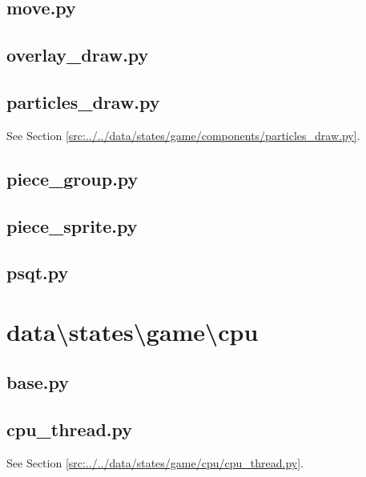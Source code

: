 \documentclass[../main/main.tex]{subfiles}
\begin{document}
\subsection{move.py}

\label{src:data/states/game/components/move.py}

\subsection{overlay\_draw.py}

\label{src:data/states/game/components/overlay_draw.py}

\subsection{particles\_draw.py}
See Section \ref{src:../../data/states/game/components/particles_draw.py}.

\subsection{piece\_group.py}

\label{src:data/states/game/components/piece_group.py}

\subsection{piece\_sprite.py}

\label{src:data/states/game/components/piece_sprite.py}

\subsection{psqt.py}

\label{src:data/states/game/components/psqt.py}

\section{data\textbackslash states\textbackslash game\textbackslash cpu}
\subsection{base.py}

\label{src:data/states/game/cpu/base.py}

\subsection{cpu\_thread.py}
See Section \ref{src:../../data/states/game/cpu/cpu_thread.py}.
\end{document}
